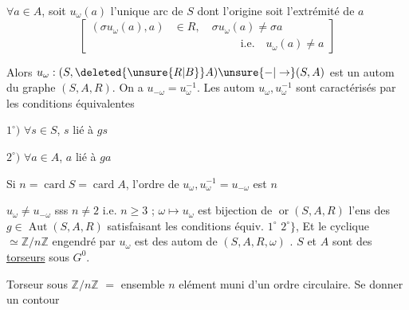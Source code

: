 \reversemarginpar
{}
\normalmarginpar
$\forall a\in A$, soit $u_{\omega}(a)$ l'unique arc de $S$ dont l'origine soit l'extrémité de $a$
\[
\left[\begin{aligned}
(\sigma u_{\omega}(a),a)&\in R,\quad \sigma u_{\omega}(a)\ne\sigma a\\
&\hspace{6em}\text{i.e.}\quad u_{\omega}(a)\ne a
\end{aligned}\right]
\]

\reversemarginpar\margin{$\big\}$}\normalmarginpar
Alors $u_{\omega}:(S,\deleted{\unsure{R|B}}A)\unsure{-|\to}(S,A)$ est un autom du graphe $(S,A,R)$. On a $u_{-\omega}=u_{\omega}^{-1}$. Les autom $u_{\omega},u_{\omega}^{-1}$ sont caractérisés par les  conditions équivalentes

$1^{\circ})$ $\forall s\in S$, $s$ lié à $gs$

$2^{\circ})$ $\forall a\in A$, $a$ lié à $ga$

Si $n=\operatorname{card}S=\operatorname{card}A$, l'ordre de $u_{\omega},u_{\omega}^{-1}=u_{-\omega}$ est $n$

 $u_{\omega}\ne u_{-\omega}$ sss $n\ne2$ i.e. $n\geq3$ ;  $\omega\longmapsto u_{\omega}$ est bijection de $\operatorname{or}(S,A,R)$  l'ens des $g\in\operatorname{Aut}(S,A,R)$ satisfaisant les conditions équiv. $1^{\circ}$  $2^{\circ}\big\}$, Et le  cyclique $\simeq\mathbb{Z}/n\mathbb{Z}$ engendré par $u_{\omega}$ est    des autom  de $(S,A,R,\omega)$ . $S$ et $A$ sont des \uline{torseurs} sous $G^{0}$.


Torseur sous $\mathbb{Z}/n\mathbb{Z}$  $=$ ensemble  $n$ elément muni d'un ordre \unsure{$^{\times}$|$^{*}$} circulaire. Se donner un contour
